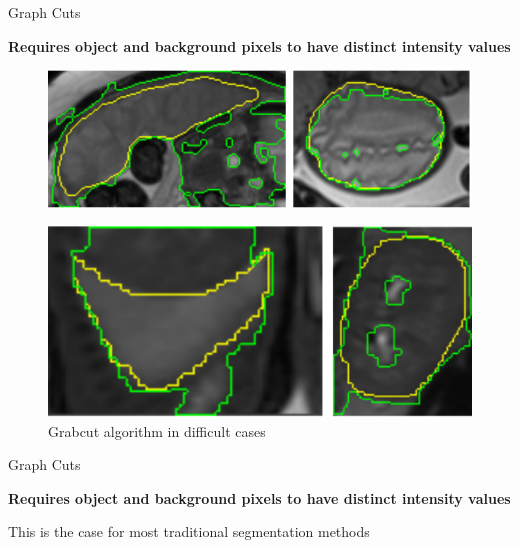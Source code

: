 \documentclass[10pt]{beamer}
\begin{document}
\begin{frame}[fragile]{Graph Cuts}

  \textbf{Requires object and background pixels to have distinct intensity values}
   
  \begin{figure}[h!]
    \centering
    \includegraphics[scale=0.25]{pictures/grabcuts1}
  \end{figure}

     
  \begin{figure}[h!]
    \centering
    \includegraphics[scale=0.25]{pictures/grabcuts2}
    \caption{Grabcut algorithm in difficult cases}
    \label{fig:minCut}
  \end{figure}
  
\end{frame}


\begin{frame}[fragile]{Graph Cuts}

  \textbf{Requires object and background pixels to have distinct intensity values}
   
  This is the case for most traditional segmentation methods
  
\end{frame}


\end{document}
